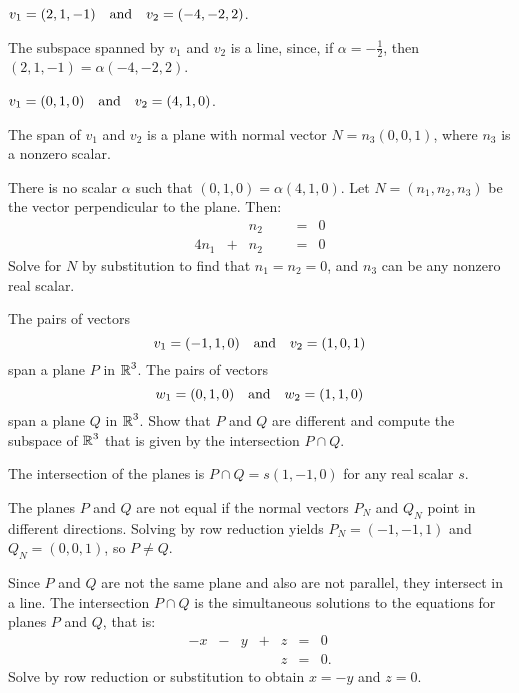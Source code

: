 \documentclass{ximera}
\begin{document}
\begin{exercise} \label{c5.7.1b}
$v_1=(2,1,-1) \quad\mbox{and}\quad v_2=(-4,-2,2)$.

\begin{solution}
\ans The subspace spanned by $v_1$ and $v_2$ is a line,
since, if $\alpha = -\frac{1}{2}$, then $(2,1,-1) = \alpha(-4,-2,2)$.

\end{solution}
\end{exercise}
\begin{exercise} \label{c5.7.1c}
$v_1=(0,1,0) \quad\mbox{and}\quad v_2=(4,1,0)$.

\begin{solution}
\ans The span of $v_1$ and $v_2$ is a plane with normal
vector $N = n_3(0,0,1)$, where $n_3$ is a nonzero scalar.

\soln There is no scalar $\alpha$ such that $(0,1,0) = \alpha(4,1,0)$. 
Let $N = (n_1,n_2,n_3)$ be the vector perpendicular to the plane.  Then:
\[
\begin{array}{rrrrrcl}
& & n_2 & & & = & 0 \\
4n_1 & + & n_2 & & & = & 0 \end{array}
\]
Solve for $N$ by substitution to find that $n_1 = n_2 = 0$, and
$n_3$ can be any nonzero real scalar.

\end{solution}
\end{exercise}

\begin{exercise} \label{c5.7.2}
The pairs of vectors
\[
     v_1=(-1,1,0) \quad\mbox{and}\quad v_2=(1,0,1)
\]
span a plane $P$ in $\mbox{$\Bbb{R}$}^3$.  The pairs of vectors
\[
        w_1=(0,1,0) \quad\mbox{and}\quad w_2=(1,1,0)
\]
span a plane $Q$ in $\mbox{$\Bbb{R}$}^3$.  Show that $P$ and $Q$
are different and compute the subspace of $\mbox{$\Bbb{R}$}^3$ that
is given by the intersection $P\cap Q$.

\begin{solution}

\ans The intersection of the planes is $P \cap Q = s(1,-1,0)$ for any
real scalar $s$.

\soln The planes $P$ and $Q$ are not equal if the normal vectors $P_N$
and $Q_N$ point in different directions.  Solving by row reduction
yields $P_N = (-1,-1,1)$ and $Q_N = (0,0,1)$, so $P \neq Q$.

\para Since $P$ and $Q$ are not the same plane and also are not
parallel, they intersect in a line.  The intersection $P \cap Q$ is
the simultaneous solutions to the equations for planes $P$ and $Q$,
that is:
\[ \begin{array}{rrrrrrl}
-x & - & y & + & z & = & 0 \\
& & & & z & = & 0. \end{array} \]
Solve by row reduction or substitution to obtain $x = -y$ and $z = 0$.

\end{solution}
\end{exercise}
\end{document}
